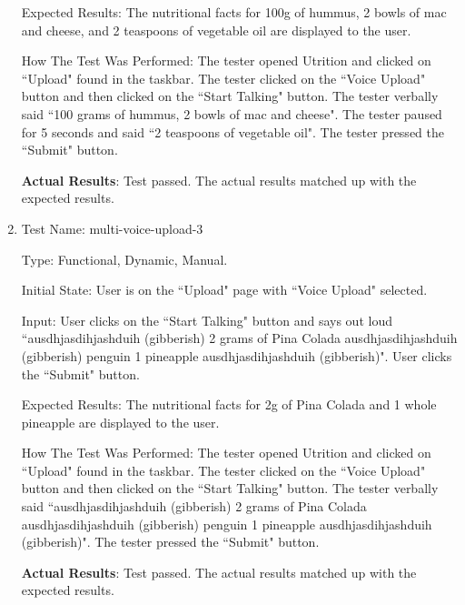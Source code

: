 \documentclass[12pt, titlepage]{article}
\begin{document}
\begin{enumerate}
		Expected Results: The nutritional facts for 100g of hummus, 2 bowls of mac and cheese, and 2 teaspoons of vegetable oil are displayed to the user.
		
		How The Test Was Performed: The tester opened Utrition and clicked on ``Upload" found in the taskbar. The tester clicked on the ``Voice Upload" button and then clicked on the ``Start Talking" button. The tester verbally said ``100 grams of hummus, 2 bowls of mac and cheese". The tester paused for 5 seconds and said ``2 teaspoons of vegetable oil". The tester pressed the ``Submit" button.
		
		\textbf{Actual Results}: Test passed. The actual results matched up with the expected results.
		
		\item{Test Name: multi-voice-upload-3}
		
		Type: Functional, Dynamic, Manual.
		
		Initial State: User is on the ``Upload" page with ``Voice Upload" selected.
		
		Input: User clicks on the ``Start Talking" button and says out loud ``ausdhjasdihjashduih (gibberish) 2 grams of Pina Colada ausdhjasdihjashduih (gibberish) penguin 1 pineapple ausdhjasdihjashduih (gibberish)". User clicks the ``Submit" button.
		
		Expected Results: The nutritional facts for 2g of Pina Colada and 1 whole pineapple are displayed to the user.
		
		How The Test Was Performed: The tester opened Utrition and clicked on ``Upload" found in the taskbar. The tester clicked on the ``Voice Upload" button and then clicked on the ``Start Talking" button. The tester verbally said ``ausdhjasdihjashduih (gibberish) 2 grams of Pina Colada ausdhjasdihjashduih (gibberish) penguin 1 pineapple ausdhjasdihjashduih (gibberish)". The tester pressed the ``Submit" button.
		
		\textbf{Actual Results}: Test passed. The actual results matched up with the expected results.
		
	\end{enumerate}
\end{document}
